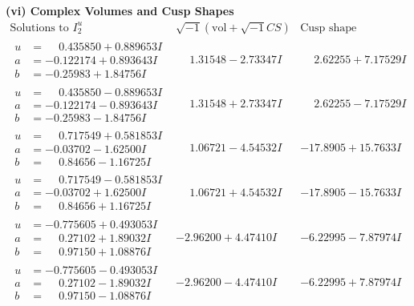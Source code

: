 \documentclass[1p]{elsarticle_modified}
\theoremstyle{definition}
\newcommand{\I}{\sqrt{-1}}
\begin{document}
\newpage\flushleft \textbf{(vi) Complex Volumes and Cusp Shapes}
$$\begin{array}{c|c|c}  
\text{Solutions to }I^u_{2}& \I (\text{vol} + \sqrt{-1}CS) & \text{Cusp shape}\\
 \hline 
\begin{aligned}
u &= \phantom{-}0.435850 + 0.889653 I \\
a &= -0.122174 + 0.893643 I \\
b &= -0.25983 + 1.84756 I\end{aligned}
 & \phantom{-}1.31548 - 2.73347 I & \phantom{-}2.62255 + 7.17529 I \\ \hline\begin{aligned}
u &= \phantom{-}0.435850 - 0.889653 I \\
a &= -0.122174 - 0.893643 I \\
b &= -0.25983 - 1.84756 I\end{aligned}
 & \phantom{-}1.31548 + 2.73347 I & \phantom{-}2.62255 - 7.17529 I \\ \hline\begin{aligned}
u &= \phantom{-}0.717549 + 0.581853 I \\
a &= -0.03702 - 1.62500 I \\
b &= \phantom{-}0.84656 - 1.16725 I\end{aligned}
 & \phantom{-}1.06721 - 4.54532 I & -17.8905 + 15.7633 I \\ \hline\begin{aligned}
u &= \phantom{-}0.717549 - 0.581853 I \\
a &= -0.03702 + 1.62500 I \\
b &= \phantom{-}0.84656 + 1.16725 I\end{aligned}
 & \phantom{-}1.06721 + 4.54532 I & -17.8905 - 15.7633 I \\ \hline\begin{aligned}
u &= -0.775605 + 0.493053 I \\
a &= \phantom{-}0.27102 + 1.89032 I \\
b &= \phantom{-}0.97150 + 1.08876 I\end{aligned}
 & -2.96200 + 4.47410 I & -6.22995 - 7.87974 I \\ \hline\begin{aligned}
u &= -0.775605 - 0.493053 I \\
a &= \phantom{-}0.27102 - 1.89032 I \\
b &= \phantom{-}0.97150 - 1.08876 I\end{aligned}
 & -2.96200 - 4.47410 I & -6.22995 + 7.87974 I \\ \hline\begin{aligned}

\end{aligned}
\end{array}$$
\end{document}
